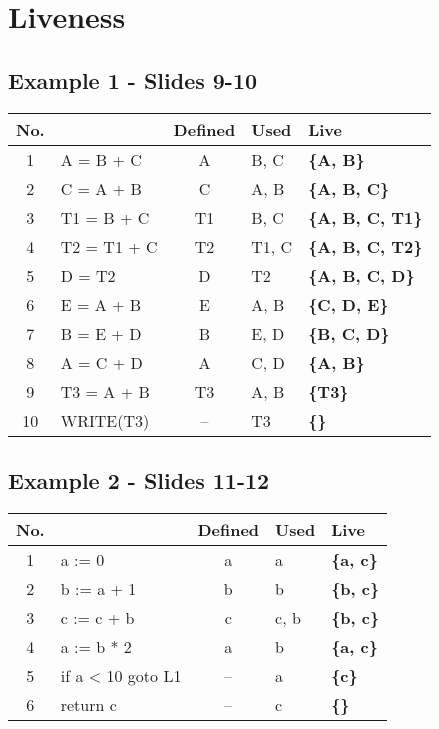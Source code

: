\documentclass{report}
\begin{document}
\section{Liveness}
\vspace{-1em}
\begin{multicols}{2}
\subsection{Example 1 - Slides 9-10}
\begin{tabular}{c|l|c|l|>{\bfseries}l}
  \textbf{No.} &  & \textbf{Defined} & \textbf{Used} & \textbf{Live} \\
  \hline
   1  & A = B + C   & A  & B, C  & \{A, B\}        \\
   2  & C = A + B   & C  & A, B  & \{A, B, C\}     \\
   3  & T1 = B + C  & T1 & B, C  & \{A, B, C, T1\} \\
   4  & T2 = T1 + C & T2 & T1, C & \{A, B, C, T2\} \\
   5  & D = T2      & D  & T2    & \{A, B, C, D\}  \\
   6  & E = A + B   & E  & A, B  & \{C, D, E\}     \\
   7  & B = E + D   & B  & E, D  & \{B, C, D\}     \\
   8  & A = C + D   & A  & C, D  & \{A, B\}        \\
   9  & T3 = A + B  & T3 & A, B  & \{T3\}          \\
  10  & WRITE(T3)   & -- & T3    & \{\}            \\
\end{tabular}
\vfill\columnbreak
\setlength{\leftskip}{3em}
\subsection{Example 2 - Slides 11-12}
\begin{tabular}{c|l|c|l|>{\bfseries}l}
  \textbf{No.} &  & \textbf{Defined} & \textbf{Used} & \textbf{Live} \\
  \hline
   1  & a := 0            & a  & a    & \{a, c\} \\
   2  & b := a + 1        & b  & b    & \{b, c\} \\
   3  & c := c + b        & c  & c, b & \{b, c\} \\
   4  & a := b * 2        & a  & b    & \{a, c\} \\
   5  & if a < 10 goto L1 & -- & a    & \{c\}    \\
   6  & return c          & -- & c    & \{\}     \\
\end{tabular}
\end{multicols}
\end{document}
